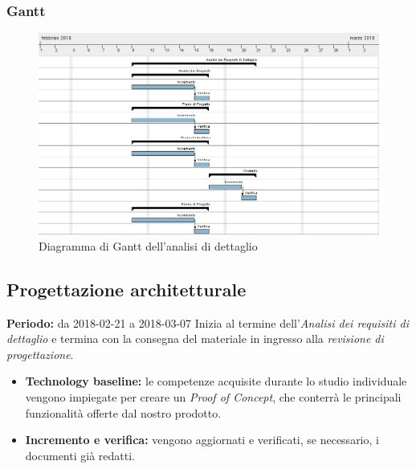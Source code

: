 \subsubsection{Gantt}
\begin{figure}[H]
	\centering 
	\includegraphics[width=1\textwidth]{images/Analisi-Dettaglio.png}
	\caption{Diagramma di Gantt dell'analisi di dettaglio}
	\label{graficobello2} 
\end{figure}
\subsection{Progettazione architetturale}
    \textbf{Periodo:} da 2018-02-21 a 2018-03-07 \Spazio
    Inizia al termine dell'\emph{Analisi dei requisiti di dettaglio} e termina con la consegna del materiale in ingresso alla \emph{revisione di progettazione}.
    \begin{itemize}
    	\item \textbf{Technology baseline:} le competenze acquisite durante lo studio individuale vengono impiegate per creare un \textit{Proof of Concept}, che conterrà le principali funzionalità offerte dal nostro prodotto.
    	\item \textbf{Incremento e verifica:} vengono aggiornati e verificati, se necessario, i documenti già redatti.	
    \end{itemize}
